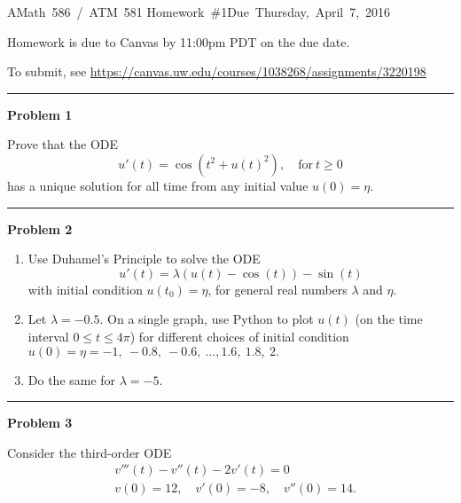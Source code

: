 \documentclass[10pt]{article}
\begin{document}
\hfill\vbox{\hbox{AMath 586 / ATM 581}
\hbox{Homework \#1}\hbox{Due Thursday, April 7, 2016}}

\vskip 5pt

Homework is due to Canvas by 11:00pm PDT on the due date.

To submit, see \url{https://canvas.uw.edu/courses/1038268/assignments/3220198}


\vskip 1cm
\hrule
{\bf Problem 1}


Prove that the ODE 
\[
u'(t) = \cos(t^2 + u(t)^2), \quad \mbox{for}~t \geq 0
\]
has a unique solution for all time from any initial value $u(0)=\eta$.




\vskip 1cm
\hrule
{\bf Problem 2}

\begin{enumerate} 
\item
Use Duhamel's Principle to solve the ODE
\begin{equation}\label{ode1}
u'(t) = \lambda (u(t)-\cos(t)) - \sin(t)
\end{equation} 
with initial condition $u(t_0) = \eta$, for general real numbers $\lambda$ and
$\eta$.  

\item
Let $\lambda = -0.5$.  On a single graph, use Python to plot $u(t)$ 
(on the time interval $0 \leq t \leq 4\pi$)
for different choices of
initial condition $u(0) = \eta = -1,~-0.8,~-0.6,~\ldots,1.6,~1.8,~2.$ 

\item Do the same for $\lambda = -5$.
\end{enumerate} 



\vskip 1cm
\hrule
{\bf Problem 3}

Consider the third-order ODE
\begin{equation*}
\begin{split}
&v'''(t) - v''(t) - 2v'(t) = 0\\
&v(0) = 12, \quad v'(0) = -8, \quad v''(0) = 14.
\end{split}
\end{equation*}
\end{document}
